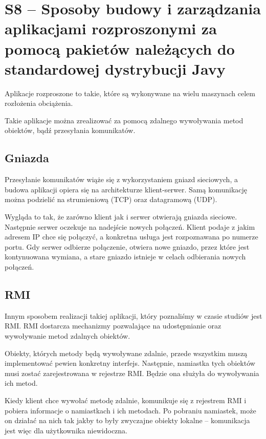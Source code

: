 \section{S8 -- Sposoby budowy i zarządzania aplikacjami rozproszonymi za pomocą pakietów należących do standardowej dystrybucji Javy}

Aplikacje rozproszone to takie, które są wykonywane na wielu maszynach celem rozłożenia obciążenia.

Takie aplikacje można zrealizować za pomocą zdalnego wywoływania metod obiektów, bądź przesyłania komunikatów.

\subsection{Gniazda}
Przesyłanie komunikatów wiąże się z wykorzystaniem gniazd sieciowych, a budowa aplikacji opiera się na architekturze klient-serwer.
Samą komunikację można podzielić na strumieniową (TCP) oraz datagramową (UDP).

Wygląda to tak, że zarówno klient jak i serwer otwierają gniazda sieciowe.
Następnie serwer oczekuje na nadejście nowych połączeń.
Klient podaje z jakim adresem IP chce się połączyć, a konkretna usługa jest rozpoznawana po numerze portu.
Gdy serwer odbierze połączenie, otwiera nowe gniazdo, przez które jest kontynuowana wymiana, a stare gniazdo istnieje w celach odbierania nowych połączeń.

\subsection{RMI}
Innym sposobem realizacji takiej aplikacji, który poznaliśmy w czasie studiów jest RMI.
RMI dostarcza mechanizmy pozwalające na udostępnianie oraz wywoływanie metod zdalnych obiektów.

Obiekty, których metody będą wywoływane zdalnie, przede wszystkim muszą implementować pewien konkretny interfejs.
Następnie, namiastka tych obiektów musi zostać zarejestrowana w rejestrze RMI.
Będzie ona służyła do wywoływania ich metod.

Kiedy klient chce wywołać metodę zdalnie, komunikuje się z rejestrem RMI i pobiera informacje o namiastkach i ich metodach.
Po pobraniu namiastek, może on działać na nich tak jakby to były zwyczajne obiekty lokalne -- komunikacja jest więc dla użytkownika niewidoczna.